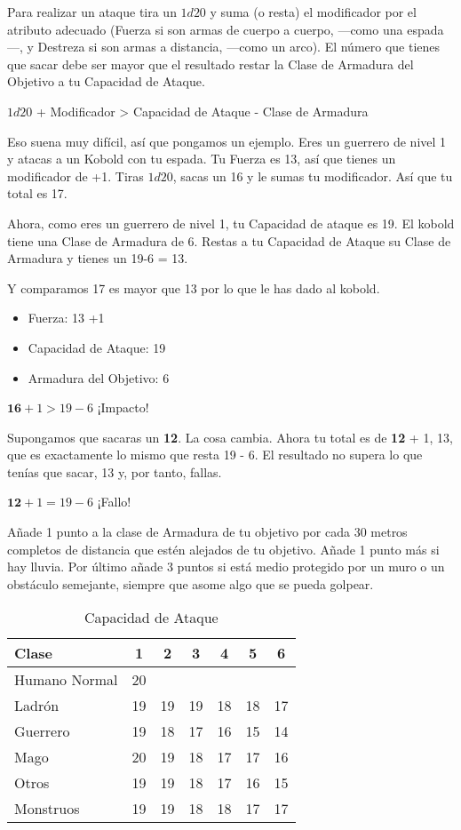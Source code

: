 \begin{multicols}{2}
Para realizar un ataque tira un $ 1d20$ y suma (o resta) el modificador por el
atributo adecuado (Fuerza si son armas de cuerpo a cuerpo, ---como una espada---,
y Destreza si son armas a distancia, ---como un arco). El número que tienes que
sacar debe ser mayor que el resultado restar la Clase de Armadura del Objetivo a
tu Capacidad de Ataque.

$1d20$ + Modificador > Capacidad de Ataque - Clase de Armadura


Eso suena muy difícil, así que pongamos un ejemplo. Eres un guerrero de nivel 1
y atacas a un Kobold con tu espada. Tu Fuerza es 13, así que tienes un
modificador de +1. Tiras $ 1d20$, sacas un 16 y le sumas tu modificador. Así que tu
total es 17.

Ahora, como eres un guerrero de nivel 1, tu Capacidad de ataque es 19. El kobold
tiene una Clase de Armadura de 6. Restas a tu Capacidad de Ataque su Clase de
Armadura y tienes un 19-6 = 13.

Y comparamos 17 es mayor que 13 por lo que le has dado al kobold.

\begin{itemize}
\item Fuerza: 13 +1
\item Capacidad de Ataque: 19
\item Armadura del Objetivo: 6
\end{itemize}

$\textbf{16} + 1 > 19 - 6$ ¡Impacto!

Supongamos que sacaras un \textbf{12}. La cosa cambia. Ahora tu total es de
\textbf{12} + 1, 13, que es exactamente lo mismo que resta 19 - 6. El resultado
no supera lo que tenías que sacar, 13 y, por tanto, fallas.

$\textbf{12} + 1 = 19 - 6$ ¡Fallo!


Añade 1 punto a la clase de Armadura de tu objetivo por cada 30 metros completos
de distancia que estén alejados de tu objetivo. Añade 1 punto más si hay lluvia.
Por último añade 3 puntos si está medio protegido por un muro o un obstáculo
semejante, siempre que asome algo que se pueda golpear.

\begin{table*}[p]
\centering
\caption{Capacidad de Ataque}
\begin{tabular}{lcccccc}
\toprule
Clase           & 1 & 2 & 3 & 4 & 5 & 6\\
\midrule
\midrule
Humano Normal   & 20\\
Ladrón          & 19 & 19 & 19 & 18 & 18 & 17\\
Guerrero        & 19 & 18 & 17 & 16 & 15 & 14\\
Mago            & 20 & 19 & 18 & 17 & 17 & 16\\
Otros           & 19 & 19 & 18 & 17 & 16 & 15\\
Monstruos       & 19 & 19 & 18 & 18 & 17 & 17\\
\bottomrule
\end{tabular}


\end{table*}
\end{multicols}
